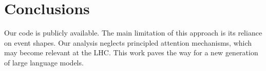 \section{Conclusions}\label{sec:conclusions}

Our code is publicly available. The main limitation of this approach is
its reliance on event shapes. Our analysis neglects principled attention
mechanisms, which may become relevant at the LHC. This work paves the
way for a new generation of large language models.

